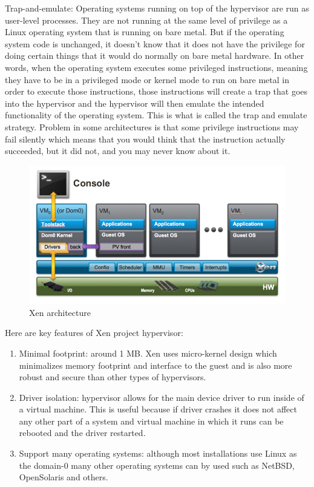 Trap-and-emulate: Operating systems running on top of the hypervisor are run as user-level processes. They are not running at the same level of privilege as a Linux operating system that is running on bare metal. But if the operating system code is unchanged, it doesn't know that it does not have the privilege for doing certain things that it would do normally on bare metal hardware. In other words, when the operating system executes some privileged instructions, meaning they have to be in a privileged mode or kernel mode to run on bare metal in order to execute those instructions, those instructions will create a trap that goes into the hypervisor and the hypervisor will then emulate the intended functionality of the operating system. This is what is called the trap and emulate strategy. Problem in some architectures is that some privilege instructions may fail silently which means that you would think that the instruction actually succeeded, but it did not, and you may never know about it.

\begin{figure}[H]
\centering
\includegraphics[scale=1]{xen-diagram.png}
\caption{Xen architecture}
\end{figure}

Here are key features of Xen project hypervisor:
\begin{enumerate}
\item Minimal footprint: around 1 MB. Xen uses micro-kernel design which minimalizes memory footprint and interface to the guest and is also more robust and secure than other types of hypervisors.
\item Driver isolation: hypervisor allows for the main device driver to run inside of a virtual machine. This is useful because if driver crashes it does not affect any other part of a system and virtual machine in which it runs can be rebooted and the driver restarted.
\item Support many operating systems: although most installations use Linux as the domain-0 many other operating systems can by used such as NetBSD, OpenSolaris and others.
\end{enumerate}


